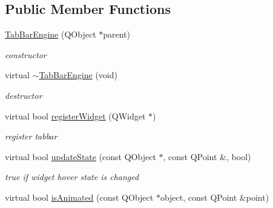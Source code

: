 \subsection*{Public Member Functions}
\begin{DoxyCompactItemize}
\item 
\mbox{\label{class_tab_bar_engine_a54acda2821dd47549a113becdc85aa9e}} 
\hyperlink{class_tab_bar_engine_a54acda2821dd47549a113becdc85aa9e}{Tab\+Bar\+Engine} (Q\+Object $\ast$parent)
\begin{DoxyCompactList}\small\item\em constructor \end{DoxyCompactList}\item 
\mbox{\label{class_tab_bar_engine_ade98e496d9fe87fca57f8a4becf526f1}} 
virtual \hyperlink{class_tab_bar_engine_ade98e496d9fe87fca57f8a4becf526f1}{$\sim$\+Tab\+Bar\+Engine} (void)
\begin{DoxyCompactList}\small\item\em destructor \end{DoxyCompactList}\item 
\mbox{\label{class_tab_bar_engine_ae5c5a4ccc034cc312beb83d6c385887f}} 
virtual bool \hyperlink{class_tab_bar_engine_ae5c5a4ccc034cc312beb83d6c385887f}{register\+Widget} (Q\+Widget $\ast$)
\begin{DoxyCompactList}\small\item\em register tabbar \end{DoxyCompactList}\item 
\mbox{\label{class_tab_bar_engine_a5bc9afe38d260ac1c8654b83de5230a2}} 
virtual bool \hyperlink{class_tab_bar_engine_a5bc9afe38d260ac1c8654b83de5230a2}{update\+State} (const Q\+Object $\ast$, const Q\+Point \&, bool)
\begin{DoxyCompactList}\small\item\em true if widget hover state is changed \end{DoxyCompactList}\item 
\mbox{\label{class_tab_bar_engine_a09492fc99a5dfc0412cf6c29dfb1fc7b}} 
virtual bool \hyperlink{class_tab_bar_engine_a09492fc99a5dfc0412cf6c29dfb1fc7b}{is\+Animated} (const Q\+Object $\ast$object, const Q\+Point \&point)

\end{DoxyCompactItemize}
